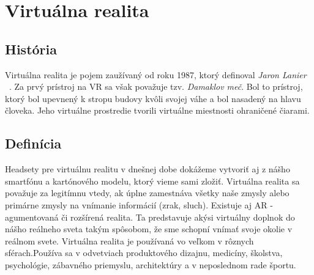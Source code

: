 \documentclass[10pt,twoside,slovak,a4paper]{article}										%
\begin{document}
\section{Virtuálna realita}	\label{VR}
\subsection{História} \label{VR:hist}		
Virtuálna realita je pojem zaužívaný od roku 1987, ktorý definoval \emph{Jaron Lanier} ~\cite{Jaron:zdroj}. Za prvý prístroj na VR sa však považuje tzv. \emph{Damaklov meč}. Bol to prístroj, ktorý bol upevnený k stropu budovy kvôli svojej váhe a bol nasadený na hlavu človeka. Jeho virtuálne prostredie tvorili virtuálne miestnosti ohraničené čiarami.

\subsection {Definícia} \label{VR:now}
Headsety pre virtuálnu realitu v dnešnej dobe dokážeme vytvoriť aj z nášho smartfónu a kartónového modelu, ktorý vieme sami zložiť. Virtuálna realita sa považuje za legitímnu vtedy, ak úplne zamestnáva všetky naše zmysly alebo primárne zmysly na vnímanie informácií (zrak, sluch). Existuje aj AR - agumentovaná či rozšírená realita. Ta predstavuje akýsi virtuálny doplnok do nášho reálneho sveta takým spôsobom, že sme schopní vnímať svoje okolie v reálnom svete. Virtuálna realita je používaná vo veľkom v rôznych sférach.Používa sa v odvetviach produktového dizajnu, medicíny, školstva, psychológie, zábavného priemyslu, architektúry a v neposlednom rade športu.~\cite{zhrnutie:zdroj}
\end{document}
